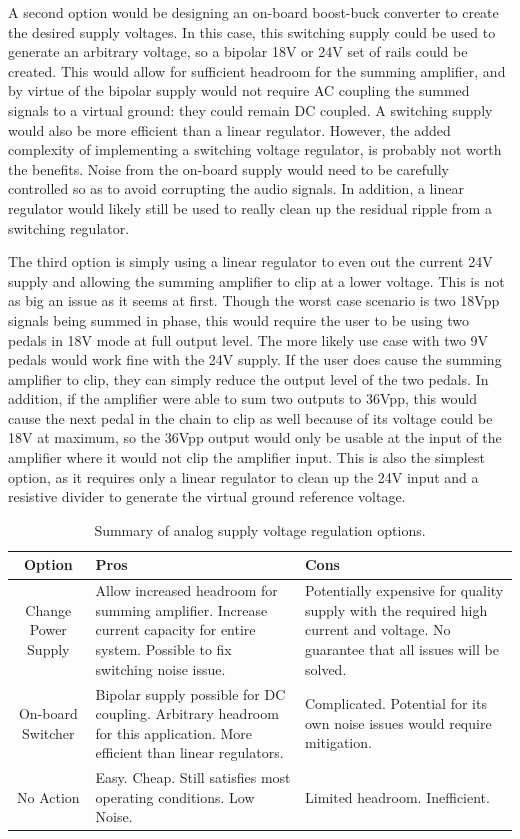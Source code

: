 \documentclass{article}
\begin{document}
	A second option would be designing an on-board boost-buck converter to create the desired supply voltages.  In this case, this switching supply could be used to generate an arbitrary voltage, so a bipolar 18V or 24V set of rails could be created.  This would allow for sufficient headroom for the summing amplifier, and by virtue of the bipolar supply would not require AC coupling the summed signals to a virtual ground: they could remain DC coupled.  A switching supply would also be more efficient than a linear regulator.  However, the added complexity of implementing a switching voltage regulator, is probably not worth the benefits.  Noise from the on-board supply would need to be carefully controlled so as to avoid corrupting the audio signals.  In addition, a linear regulator would likely still be used to really clean up the residual ripple from a switching regulator.

	The third option is simply using a linear regulator to even out the current 24V supply and allowing the summing amplifier to clip at a lower voltage.  This is not as big an issue as it seems at first.  Though the worst case scenario is two 18Vpp signals being summed in phase, this would require the user to be using two pedals in 18V mode at full output level.  The more likely use case with two 9V pedals would work fine with the 24V supply.  If the user does cause the summing amplifier to clip, they can simply reduce the output level of the two pedals.  In addition, if the amplifier were able to sum two outputs to 36Vpp, this would cause the next pedal in the chain to clip as well because of its voltage could be 18V at maximum, so the 36Vpp output would only be usable at the input of the amplifier where it would not clip the amplifier input.  This is also the simplest option, as it requires only a linear regulator to clean up the 24V input and a resistive divider to generate the virtual ground reference voltage.  

	\begin{table}
	\begin{center}
	\begin{tabular}{|c|p{2.25in} p{2.25in}|}
	\hline
	Option & Pros & Cons \\
	\hline
	Change Power Supply 	& Allow increased headroom for summing amplifier.  Increase current capacity for entire system.  Possible to fix switching noise issue. 
								& Potentially expensive for quality supply with the required high current and voltage.  No guarantee that all issues will be solved. \\
	On-board Switcher 		& Bipolar supply possible for DC coupling.  Arbitrary headroom for this application.  More efficient than linear regulators. 	
								& Complicated.  Potential for its own noise issues would require mitigation. \\
	No Action 				& Easy.  Cheap.  Still satisfies most operating conditions. Low Noise.
								& Limited headroom.  Inefficient. \\
	\hline
	\end{tabular}
	\caption{Summary of analog supply voltage regulation options.}
	\label{tab:pwrsupplyproscons}
	\end{center}
	\end{table}
\end{document}
